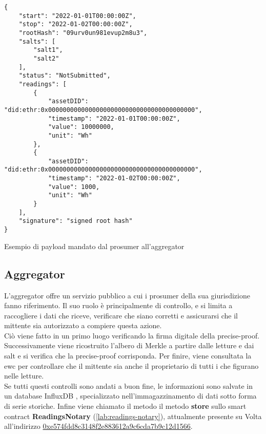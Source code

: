 \begin{listing}[h]
    \begin{verbatim}
{
    "start": "2022-01-01T00:00:00Z",
    "stop": "2022-01-02T00:00:00Z",
    "rootHash": "09urv0un981evup2m8u3",
    "salts": [
        "salt1",
        "salt2"
    ],
    "status": "NotSubmitted",
    "readings": [
        {
            "assetDID": "did:ethr:0x0000000000000000000000000000000000000000",
            "timestamp": "2022-01-01T00:00:00Z",
            "value": 10000000,
            "unit": "Wh"
        },
        {
            "assetDID": "did:ethr:0x0000000000000000000000000000000000000000",
            "timestamp": "2022-01-02T00:00:00Z",
            "value": 1000,
            "unit": "Wh"
        }
    ],
    "signature": "signed root hash"
}
\end{verbatim}
    \caption{Esempio di payload mandato dal \gls{prosumer} all'\gls{aggregator}}\label{lab:prosumer-payload}
\end{listing}

\subsection{Aggregator}
L'\gls{aggregator} offre un servizio pubblico a cui i \gls{prosumer} della sua giurisdizione fanno riferimento.
Il suo ruolo è principalmente di controllo, e si limita a raccogliere i dati che riceve, verificare che siano corretti e
assicurarsi che il mittente sia autorizzato a compiere questa azione. \\
Ciò viene fatto in un primo luogo verificando la firma digitale della precise-proof.
Successivamente viene ricostruito l'albero di Merkle a partire dalle letture e dai salt e si verifica che la precise-proof corrisponda.
Per finire, viene consultata la \gls{ewc} per controllare che il mittente sia anche il proprietario di tutti i  che figurano nelle letture. \\
Se tutti questi controlli sono andati a buon fine, le informazioni sono salvate in un database InfluxDB \cite{sftw:influxdb}, specializzato nell'immagazzinamento di dati sotto forma di serie storiche.
Infine viene chiamato il metodo il metodo \textbf{store} sullo smart contract \textbf{ReadingsNotary} (\autoref{lab:readings-notary}), attualmente presente su Volta all'indirizzo \href{https://volta-explorer.energyweb.org/address/0xe574fDD8C3148f2E883612A9C6CDA7b9C12d1566/transactions}{0xe574fdd8c3148f2e883612a9c6cda7b9c12d1566}.

